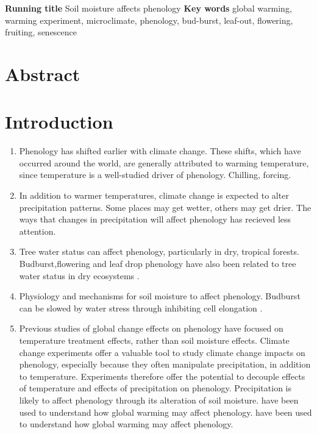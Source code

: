 \documentclass{article}
\begin{document}
\begin{singlespace}
\textbf{Running title} Soil moisture affects phenology
\textbf{Key words} global warming, warming experiment, microclimate, phenology, bud-burst, leaf-out, flowering, fruiting, senescence 
\end{singlespace}


\clearpage
\section*{Abstract}

\section* {Introduction}
\begin{singlespace}
\begin{enumerate}
\item Phenology has shifted earlier with climate change. These shifts, which have occurred around the world, are generally attributed to warming temperature, since temperature is a well-studied driver of phenology.  Chilling, forcing. 
\item In addition to warmer temperatures, climate change is expected to alter precipitation patterns. Some places may get wetter, others may get drier. The ways that changes in precipitation will affect phenology has recieved less attention. 
\item Tree water status can affect phenology, particularly in dry, tropical forests. Budburst,flowering and leaf drop phenology have also been related to tree water status in dry ecosystems \citep{essiamah1986,reich1984, van1993}. 
\item Physiology and mechanisms for soil moisture to affect phenology. Budburst can be slowed by water stress through inhibiting cell elongation \citep{essiamah1986}.
\item Previous studies of global change effects on phenology have focused on temperature treatment effects, rather than soil moisture effects. Climate change experiments offer a valuable tool to study climate change impacts on phenology, especially because they often manipulate precipitation, in addition to temperature. Experiments therefore offer the potential to decouple effects of temperature and effects of precipitation on phenology. Precipitation is likely to affect phenology through its alteration of soil moisture.  have been used to understand how global warming may affect phenology.  have been used to understand how global warming may affect phenology. 
\end{enumerate}


\end{singlespace}
\end{document}
